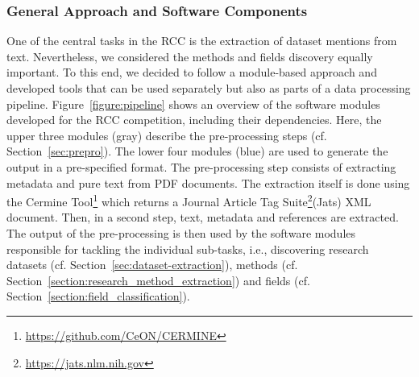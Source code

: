 
\subsubsection{General Approach and Software Components}
One of the central tasks in the RCC is the extraction of dataset mentions from text. 
Nevertheless, we considered the methods and fields discovery equally important.
To this end, we decided to follow a module-based approach and developed tools that can be used separately but also as parts of a data processing pipeline.
Figure~\ref{figure:pipeline} shows an overview of the software modules developed for the RCC competition, including their dependencies. Here, the upper three modules (gray) describe the pre-processing steps (cf. Section~\ref{sec:prepro}).
The lower four modules (blue) are used to generate the output in a pre-specified format. 
The pre-processing step consists of extracting metadata and pure text from PDF documents. The extraction itself is done using the Cermine Tool\footnote{\url{https://github.com/CeON/CERMINE}} which returns a Journal Article Tag Suite\footnote{\url{https://jats.nlm.nih.gov}}(Jats) XML document. Then, in a second step,
text, metadata and references are extracted. The output of the pre-processing is then used by the software modules responsible for tackling the individual sub-tasks, i.e., discovering research datasets (cf. Section~\ref{sec:dataset-extraction}), methods (cf. Section~\ref{section:research_method_extraction}) and fields (cf. Section~\ref{section:field_classification}).


